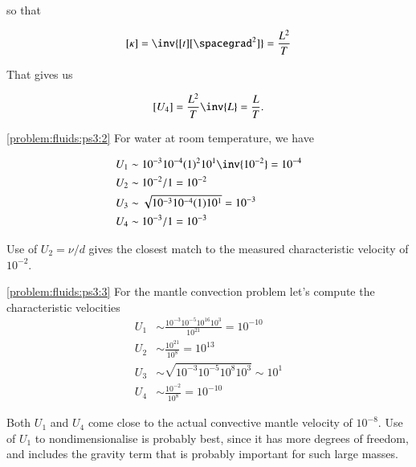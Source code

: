 \begin{Answer}[ref={problem:fluids:ps3}]
\begin{enumerate}
so that 

\begin{equation}\label{eqn:continuumProblemSet3:150}
[\kappa] = \inv{[t][\spacegrad^2]} = \frac{L^2}{T}
\end{equation}

That gives us

\begin{equation}\label{eqn:continuumProblemSet3:170}
[U_4] = \frac{L^2}{T} \inv{L} = \frac{L}{T}.
\end{equation}
\end{enumerate}


\ref{problem:fluids:ps3:2} For water at room temperature, we have

\begin{align}\label{eqn:continuumProblemSet3:190}
U_1 &\sim 10^{-3} 10^{-4} (1)^2 10^1 \inv{10^{-2}} = 10^{-4} \\
U_2 &\sim 10^{-2}/1 = 10^{-2} \\
U_3 &\sim \sqrt{ 10^{-3} 10^{-4} (1) 10^1 } = 10^{-3} \\
U_4 &\sim 10^{-3}/1 = 10^{-3}
\end{align}

Use of $U_2 = \nu/d$ gives the closest match to the measured characteristic velocity of $10^{-2}$.

\ref{problem:fluids:ps3:3} For the mantle convection problem let's compute the characteristic velocities
\begin{align}\label{eqn:continuumProblemSet3:210}
U_1 &\sim \frac{10^{-3} 10^{-5} 10^{16} 10^3 }{10^{21}} = 10^{-10} \\
U_2 &\sim \frac{10^{21}}{10^8} = 10^{13} \\
U_3 &\sim \sqrt{ 10^{-3} 10^{-5} 10^8 10^3 } \sim 10^1 \\
U_4 &\sim \frac{10^{-2}}{10^8} = 10^{-10}
\end{align}

Both $U_1$ and $U_4$ come close to the actual convective mantle velocity of $10^{-8}$.  Use of $U_1$ to nondimensionalise is probably best, since it has more degrees of freedom, and includes the gravity term that is probably important for such large masses.

\end{Answer}


